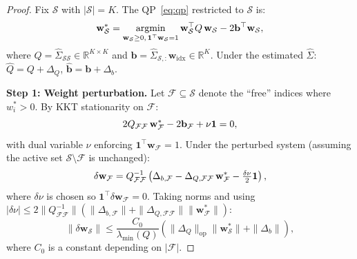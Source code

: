 \documentclass[letterpaper]{article}
\newcommand{\bw}{\mathbf{w}}
\newcommand{\bSigma}{\hat{\Sigma}}
\newcommand{\cS}{\mathcal{S}}
\begin{document}
\begin{proof}
Fix $\cS$ with $|\cS| = K$. The QP~\eqref{eq:qp} restricted to $\cS$ is:
\begin{equation}
\bw^*_\cS = \operatorname*{argmin}_{\bw_\cS \geq 0,\, \mathbf{1}^\top \bw_\cS = 1} \bw_\cS^\top Q\, \bw_\cS - 2\mathbf{b}^\top \bw_\cS, \notag
\end{equation}
where $Q = \bSigma_{\cS\cS} \in \mathbb{R}^{K \times K}$ and $\mathbf{b} = \bSigma_{\cS,:}\bw_{\mathrm{idx}} \in \mathbb{R}^K$. Under the estimated $\hat\Sigma$: $\hat{Q} = Q + \Delta_Q$, $\hat{\mathbf{b}} = \mathbf{b} + \Delta_b$.

\textbf{Step 1: Weight perturbation.} Let $\mathcal{F} \subseteq \cS$ denote the ``free'' indices where $w^*_i > 0$. By KKT stationarity on $\mathcal{F}$:
\begin{equation}
2Q_{\mathcal{F}\mathcal{F}}\, \bw^*_\mathcal{F} - 2\mathbf{b}_\mathcal{F} + \nu \mathbf{1} = 0, \notag
\end{equation}
with dual variable $\nu$ enforcing $\mathbf{1}^\top \bw_\mathcal{F} = 1$. Under the perturbed system (assuming the active set $\cS \setminus \mathcal{F}$ is unchanged):
\begin{equation}
\delta\bw_\mathcal{F} = Q_{\mathcal{F}\mathcal{F}}^{-1}\left(\Delta_{b,\mathcal{F}} - \Delta_{Q,\mathcal{F}\mathcal{F}}\, \bw^*_\mathcal{F} - \tfrac{\delta\nu}{2}\mathbf{1}\right), \notag
\end{equation}
where $\delta\nu$ is chosen so $\mathbf{1}^\top \delta\bw_\mathcal{F} = 0$. Taking norms and using $|\delta\nu| \leq 2\|Q_{\mathcal{F}\mathcal{F}}^{-1}\|(\|\Delta_{b,\mathcal{F}}\| + \|\Delta_{Q,\mathcal{F}\mathcal{F}}\| \|\bw^*_\mathcal{F}\|)$:
\begin{equation}
\|\delta\bw_\cS\| \leq \frac{C_0}{\lambda_{\min}(Q)}\left(\|\Delta_Q\|_{\mathrm{op}}\|\bw^*_\cS\| + \|\Delta_b\|\right),
\end{equation}
where $C_0$ is a constant depending on $|\mathcal{F}|$.


\end{proof}
\end{document}
